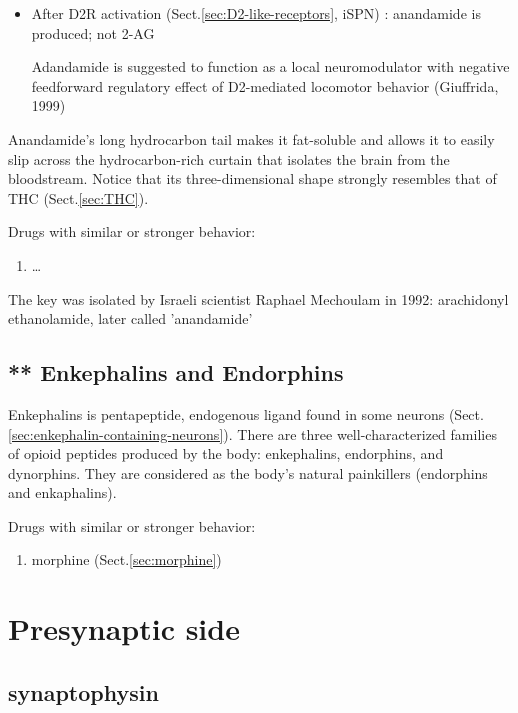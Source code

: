 \begin{itemize}
  \item After D2R activation (Sect.\ref{sec:D2-like-receptors}, iSPN) :
  anandamide is produced; not 2-AG

Adandamide is suggested to function as a local neuromodulator with negative
feedforward regulatory effect of D2-mediated locomotor behavior (Giuffrida,
1999)

\end{itemize}

Anandamide's long hydrocarbon tail makes it fat-soluble and allows it to easily
slip across the hydrocarbon-rich curtain that isolates the brain from the
bloodstream. Notice that its three-dimensional shape strongly resembles that of
THC (Sect.\ref{sec:THC}).

Drugs with similar or stronger behavior:
\begin{enumerate}
  \item \ldots
\end{enumerate}
The key was isolated by Israeli scientist Raphael Mechoulam in 1992: arachidonyl
ethanolamide, later called 'anandamide'


\subsection{** Enkephalins and Endorphins}
\label{sec:enkephalins}
\label{sec:endorphins}

Enkephalins is pentapeptide, endogenous ligand found in some neurons
(Sect.\ref{sec:enkephalin-containing-neurons}).
There are three well-characterized families of opioid peptides produced by the
body: enkephalins, endorphins, and dynorphins.  They are considered as the
body's natural painkillers (endorphins and enkaphalins).

Drugs with similar or stronger behavior:
\begin{enumerate}
  \item morphine (Sect.\ref{sec:morphine})
\end{enumerate}




\section{Presynaptic side}
\label{sec:presynaptic-side-structure}

\subsection{synaptophysin}
\label{sec:synaptophysin}


